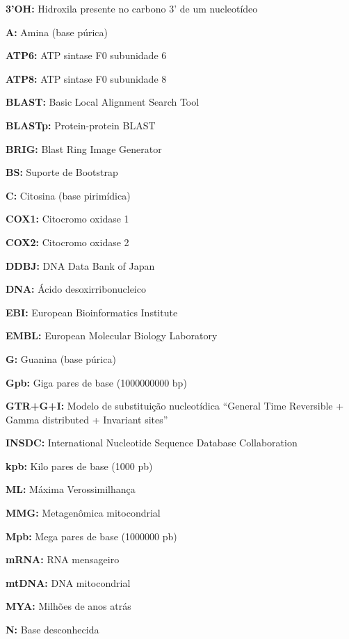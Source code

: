 \documentclass[
	12pt,				%
	oneside,
	a4paper,			%
	english,			%
	spanish,			%
	brazil				%
	]{abntex2}
\begin{document}
\begin{siglas}
  \item[\textbf{3’OH:}] Hidroxila presente no carbono 3’ de um nucleotídeo
  \item[\textbf{A:}] Amina (base púrica)
  \item[\textbf{ATP6:}] ATP sintase F0 subunidade 6
  \item[\textbf{ATP8:}] ATP sintase F0 subunidade 8
  \item[\textbf{BLAST:}] Basic Local Alignment Search Tool
  \item[\textbf{BLASTp:}] Protein-protein BLAST
  \item[\textbf{BRIG:}] Blast Ring Image Generator
  \item[\textbf{BS:}] Suporte de Bootstrap
  \item[\textbf{C:}] Citosina (base pirimídica)
  \item[\textbf{COX1:}] Citocromo oxidase 1
  \item[\textbf{COX2:}] Citocromo oxidase 2
  \item[\textbf{DDBJ:}] DNA Data Bank of Japan
  \item[\textbf{DNA:}] Ácido desoxirribonucleico
  \item[\textbf{EBI:}] European Bioinformatics Institute
  \item[\textbf{EMBL:}] European Molecular Biology Laboratory
  \item[\textbf{G:}] Guanina (base púrica)
  \item[\textbf{Gpb:}] Giga pares de base (1000000000 bp)
  \item[\textbf{GTR+G+I:}] Modelo de substituição nucleotídica “General Time Reversible + Gamma distributed + Invariant sites”
  \item[\textbf{INSDC:}] International Nucleotide Sequence Database Collaboration
  \item[\textbf{kpb:}] Kilo pares de base (1000 pb)
  \item[\textbf{ML:}] Máxima Verossimilhança
  \item[\textbf{MMG:}] Metagenômica mitocondrial
  \item[\textbf{Mpb:}] Mega pares de base (1000000 pb)
  \item[\textbf{mRNA:}] RNA mensageiro
  \item[\textbf{mtDNA:}] DNA mitocondrial
  \item[\textbf{MYA:}] Milhões de anos atrás
  \item[\textbf{N:}] Base desconhecida

\end{siglas}
\end{document}
